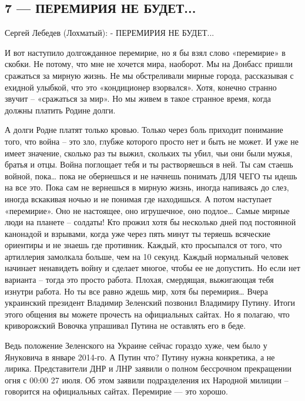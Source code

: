  

\clearpage
\subsection{7	--- ПЕРЕМИРИЯ НЕ БУДЕТ...}

Сергей Лебедев (Лохматый):
- ПЕРЕМИРИЯ НЕ БУДЕТ...

И вот наступило долгожданное перемирие, но я бы взял слово «перемирие» в скобки. Не потому, что мне не хочется мира, наоборот. Мы на Донбасс пришли сражаться за мирную жизнь. Не мы обстреливали мирные города, рассказывая с ехидной улыбкой, что это «кондиционер взорвался». Хотя, конечно странно звучит – «сражаться за мир». Но мы живем в такое странное время, когда должны платить Родине долги.

А долги Родне платят только кровью. Только через боль приходит понимание того, что война – это зло, глубже которого просто нет и быть не может. И уже не имеет значение, сколько раз ты выжил, скольких ты убил, чьи они были мужья, братья и отцы. Война поглощает тебя и ты растворяешься в ней. Ты сам стаешь войной, пока… пока не обернешься и не начнешь понимать ДЛЯ ЧЕГО ты идешь на все это. Пока сам не вернешься в мирную жизнь, иногда напиваясь до слез, иногда вскакивая ночью и не понимая где находишься.
А потом наступает «перемирие». Оно не настоящее, оно игрушечное, оно подлое… Самые мирные люди на планете – солдаты! Кто прожил хотя бы несколько дней под постоянной канонадой и взрывами, когда уже через пять минут ты теряешь всяческие ориентиры и не знаешь где противник. Каждый, кто просыпался от того, что артиллерия замолкала больше, чем на 10 секунд. Каждый нормальный человек начинает ненавидеть войну и сделает многое, чтобы ее не допустить. Но если нет варианта – тогда это просто работа. Плохая, смердящая, выжигающая тебя изнутри работа.
Но ты все равно ждешь мир, хотя бы перемирия…
Вчера украинский президент Владимир Зеленский позвонил Владимиру Путину. Итоги этого общения вы можете прочесть на официальных сайтах.
Но я полагаю, что криворожский Вовочка упрашивал Путина не оставлять его в беде.

Ведь положение Зеленского на Украине сейчас гораздо хуже, чем было у Януковича в январе 2014-го.
А Путин что?
Путину нужна конкретика, а не лирика.
Представители ДНР и ЛНР заявили о полном бессрочном прекращении огня с 00:00 27 июля.
Об этом заявили подразделения их Народной милиции – говорится на официальных сайтах.
Перемирие — это хорошо.

